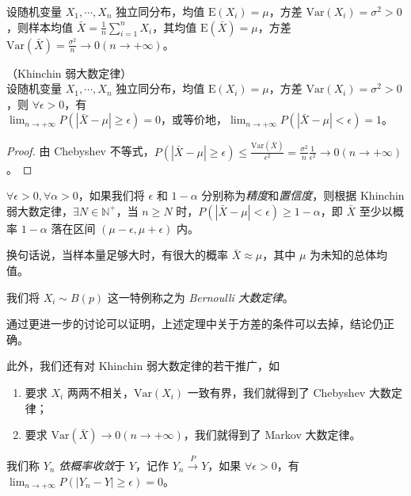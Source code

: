 \documentclass[../main.tex]{subfiles}
\begin{document}
设随机变量 $X_1,\cdots,X_n$ 独立同分布，均值 $\mathrm E(X_i)=\mu$，方差 $\mathrm{Var}(X_i)=\sigma^2>0$，则样本均值 $\bar X=\frac1n\sum_{i=1}^nX_i$，其均值 $\mathrm E(\bar X)=\mu$，方差 $\mathrm{Var}(\bar X)=\frac{\sigma^2}n\rightarrow0(n\rightarrow+\infty)$。


\begin{theorem}\label{thm:5.2.1}
    （Khinchin 弱大数定律）\\
    设随机变量 $X_1,\cdots,X_n$ 独立同分布，均值 $\mathrm E(X_i)=\mu$，方差 $\mathrm{Var}(X_i)=\sigma^2>0$，则 $\forall\epsilon>0$，有\\
    $\lim_{n\rightarrow+\infty}P(|\bar X-\mu|\geq\epsilon)=0$，或等价地，$\lim_{n\rightarrow+\infty}P(|\bar X-\mu|<\epsilon)=1$。
\end{theorem}

\begin{proof}
    由 Chebyshev 不等式，$P(|\bar X-\mu|\geq\epsilon)\leq\frac{\mathrm{Var}(\bar X)}{\epsilon^2}=\frac{\sigma^2}n\frac1{\epsilon^2}\rightarrow0(n\rightarrow+\infty)$。
\end{proof}

$\forall\epsilon>0,\forall\alpha>0$，如果我们将 $\epsilon$ 和 $1-\alpha$ 分别称为\emph{精度}和\emph{置信度}，则根据 Khinchin 弱大数定律，$\exists N\in\mathbb N^+$，当 $n\geq N$ 时，$P(|\bar X-\mu|<\epsilon)\geq1-\alpha$，即 $\bar X$ 至少以概率 $1-\alpha$ 落在区间 $(\mu-\epsilon,\mu+\epsilon)$ 内。

换句话说，当样本量足够大时，有很大的概率 $\bar X\approx\mu$，其中 $\mu$ 为未知的总体均值。

我们将 $X_i\sim B(p)$ 这一特例称之为 \emph{Bernoulli 大数定律}。

通过更进一步的讨论可以证明，上述定理中关于方差的条件可以去掉，结论仍正确。

此外，我们还有对 Khinchin 弱大数定律的若干推广，如
\begin{enumerate}
    \item 要求 $X_i$ 两两不相关，$\mathrm{Var}(X_i)$ 一致有界，我们就得到了 Chebyshev 大数定律；
    \item 要求 $\mathrm{Var}(\bar X)\rightarrow0(n\rightarrow+\infty)$，我们就得到了 Markov 大数定律。
\end{enumerate}

\begin{definition}\label{def:5.2.1}
    我们称 $Y_n$ \emph{依概率收敛}于 $Y$，记作 $Y_n\overset{P}{\rightarrow}Y$，如果 $\forall\epsilon>0$，有 $\lim_{n\rightarrow+\infty}P(|Y_n-Y|\geq\epsilon)=0$。
\end{definition}
\end{document}
